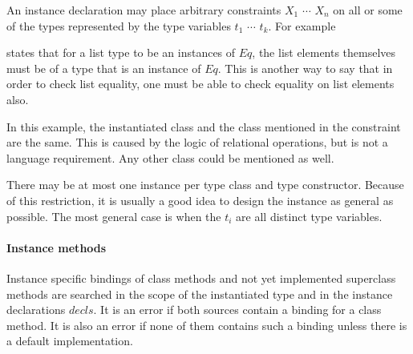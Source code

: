 An instance declaration may place arbitrary constraints $X_1$ $\cdots$ $X_n$ on all or some of the types represented by the type variables $t_1$ $\cdots$ $t_k$. For example


states that for a list type to be an instances of $Eq$, the list elements themselves must be of a type that is an instance of $Eq$. This is another way to say that in order to check list equality, one must be able to check equality on list elements also.

In this example, the instantiated class and the class mentioned in the constraint are the same. This is caused by the logic of relational operations, but is not a language requirement. Any other class could be mentioned as well.

There may be at most one instance per type class and type constructor. Because of this restriction, it is usually a good idea to design the instance as general as possible. The most general case is when the $t_i$ are all distinct type variables.



\paragraph*{Instance methods}
Instance specific bindings of class methods and not yet implemented superclass methods are searched in the scope of the instantiated type and in the instance declarations $decls$.
It is an error if both sources contain a binding for a class method. It is also an error if none of them contains such a binding unless  there is a default implementation.

